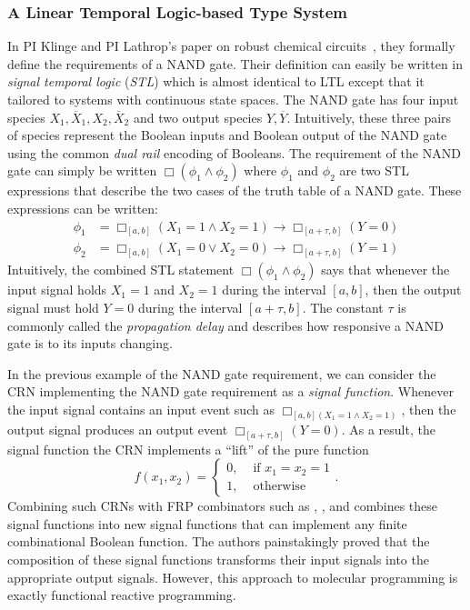 \subsubsection{A Linear Temporal Logic-based Type System}

In PI Klinge and PI Lathrop's paper on robust chemical circuits~\cite{rdc}, they formally define the requirements of a NAND gate.
Their definition can easily be written in \emph{signal temporal logic} (\emph{STL}) which is almost identical to LTL except that it tailored to systems with continuous state spaces.
The NAND gate has four input species \( X_1, \overline{X}_1, X_2, \overline{X}_2  \) and two output species \( Y, \overline{Y} \).
Intuitively, these three pairs of species represent the Boolean inputs and Boolean output of the NAND gate using the common \emph{dual rail} encoding of Booleans.
The requirement of the NAND gate can simply be written \( \Box(\phi_1 \land \phi_2) \) where \( \phi_1 \) and \( \phi_2 \) are two STL expressions that describe the two cases of the truth table of a NAND gate.
These expressions can be written:
\begin{align*}
    \phi_1 &= \Box_{[a,b]} (X_1 = 1 \land X_2 = 1) \rightarrow \Box_{[a+\tau, b]} (Y = 0)\\
    \phi_2 &= \Box_{[a,b]} (X_1 = 0 \lor X_2 = 0)  \rightarrow \Box_{[a+\tau, b]} (Y = 1)
\end{align*}
Intuitively, the combined STL statement \( \Box(\phi_1 \land \phi_2) \) says that whenever the input signal holds \( X_1 = 1 \) and \( X_2 = 1 \) during the interval \( [a,b] \), then the output signal must hold \( Y = 0 \) during the interval \( [a+\tau, b] \).
The constant \( \tau \) is commonly called the \emph{propagation delay} and describes how responsive a NAND gate is to its inputs changing.

In the previous example of the NAND gate requirement, we can consider the CRN implementing the NAND gate requirement as a \emph{signal function}.
Whenever the input signal contains an input event such as \( \Box_{[a,b](X_1 = 1 \land X_2 = 1)} \), then the output signal produces an output event \( \Box_{[a+\tau, b]}(Y = 0) \).
As a result, the signal function the CRN implements a ``lift'' of the pure function
\[
    f(x_1, x_2) =
    \begin{cases}
        0, &\text{ if }x_1 = x_2 = 1\\
        1, &\text{ otherwise}
    \end{cases}.
\]
Combining such CRNs with FRP combinators such as \hask{>>>}, \hask{&&&}, and \hask{***} combines these signal functions into new signal functions that can implement any finite combinational Boolean function.
The authors painstakingly proved that the composition of these signal functions transforms their input signals into the appropriate output signals.
However, this approach to molecular programming is exactly functional reactive programming.

